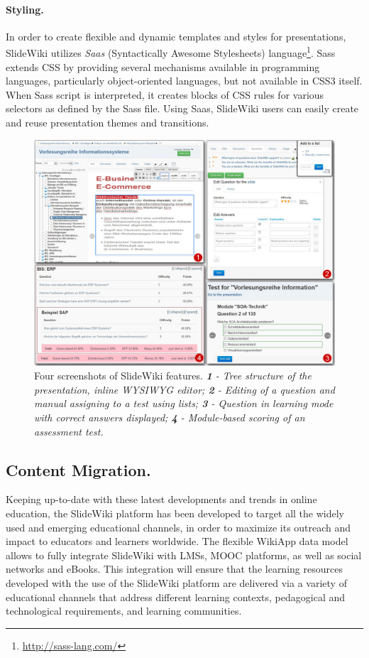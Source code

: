 \documentclass[ngerman,UKenglish,table]{scrbook}
\begin{document}
\paragraph{Styling.}
In order to create flexible and dynamic templates and styles for presentations, SlideWiki utilizes \emph{Saas} (Syntactically Awesome Stylesheets) language\footnote{\url{http://sass-lang.com/}}.
Sass extends CSS by providing several mechanisms available in programming languages, particularly object-oriented languages, but not available in CSS3 itself.
When Sass script is interpreted, it creates blocks of CSS rules for various selectors as defined by the Sass file.
Using Saas, SlideWiki users can easily create and reuse presentation themes and transitions.


\begin{figure}[t!]
	\centering
		\includegraphics[width=\textwidth]{images/screenshot1.jpg}
	\caption{Four screenshots of SlideWiki features. \textit{\textbf{1} - Tree structure of the presentation, inline WYSIWYG editor; \textbf{2} - Editing of a question and manual assigning to a test using lists; \textbf{3} - Question in learning mode with correct answers displayed; \textbf{4} - Module-based scoring of an assessment test.}}
	\label{fig:screenshot}
\end{figure}


\subsection{Content Migration.}
\label{sec:content_migration}
Keeping up-to-date with these latest developments and trends in online education, the SlideWiki platform has been developed to target all the widely used and emerging educational channels, in order to maximize its outreach and impact to educators and learners worldwide.
The flexible WikiApp data model allows to fully integrate SlideWiki with LMSs, MOOC platforms, as well as social networks and eBooks.
This integration will ensure that the learning resources developed with the use of the SlideWiki platform are delivered via a variety of educational channels that address different learning contexts, pedagogical and technological requirements, and learning communities. 
\end{document}
